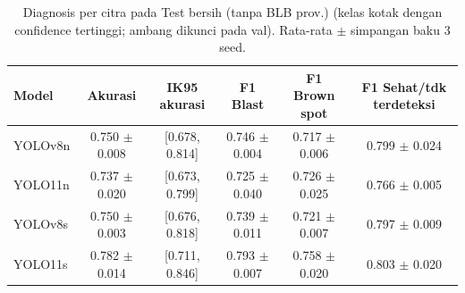 \begin{table}[!t]
\centering
\caption{Diagnosis per citra pada Test bersih (tanpa BLB prov.) (kelas kotak dengan confidence tertinggi; ambang dikunci pada val). Rata-rata $\pm$ simpangan baku 3 seed.}
\label{tab:diagnosis_test_bersih}
\footnotesize
\begin{tabular}{lccccc}
\hline
\textbf{Model} & \textbf{Akurasi} & \textbf{IK95 akurasi} & \textbf{F1 Blast} & \textbf{F1 Brown spot} & \textbf{F1 Sehat/tdk terdeteksi} \\
\hline
YOLOv8n & 0.750 $\pm$ 0.008 & [0.678, 0.814] & 0.746 $\pm$ 0.004 & 0.717 $\pm$ 0.006 & 0.799 $\pm$ 0.024 \\
YOLO11n & 0.737 $\pm$ 0.020 & [0.673, 0.799] & 0.725 $\pm$ 0.040 & 0.726 $\pm$ 0.025 & 0.766 $\pm$ 0.005 \\
YOLOv8s & 0.750 $\pm$ 0.003 & [0.676, 0.818] & 0.739 $\pm$ 0.011 & 0.721 $\pm$ 0.007 & 0.797 $\pm$ 0.009 \\
YOLO11s & 0.782 $\pm$ 0.014 & [0.711, 0.846] & 0.793 $\pm$ 0.007 & 0.758 $\pm$ 0.020 & 0.803 $\pm$ 0.020 \\
\hline
\end{tabular}
\end{table}
